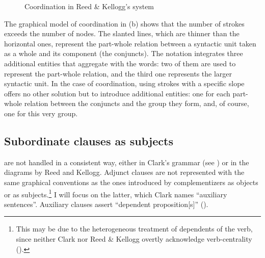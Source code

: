 \documentclass[english,output=paper,colorlinks,citecolor=brown]{../langscibook}
\begin{document}
\begin{figure}[b]
    \caption{Coordination in Reed \& Kellogg's system \label{fig:4:8}}
\end{figure}

The graphical model of coordination in (b) shows that the number of strokes exceeds the number of nodes. The slanted lines, which are thinner than the horizontal ones, represent the part-whole relation between a syntactic unit taken as a whole and its component (the conjuncts). The notation integrates three additional entities that aggregate with the words: two of them are used to represent the part-whole relation, and the third one represents the larger syntactic unit. In the case of coordination, using strokes with a specific slope offers no other solution but to introduce additional entities: one for each part-whole relation between the conjuncts and the group they form, and, of course, one for this very group.


\subsection{Subordinate clauses as subjects}\label{sec:4:4.3}

 are not handled in a consistent way, either in Clark’s grammar  (see \citealt[319--322 and 328--329]{Mazziotta2016}) or in the diagrams by Reed and Kellogg. Adjunct clauses are not represented with the same graphical conventions as the ones introduced by complementizers as objects or as subjects.\footnote{This may be due to the heterogeneous treatment of dependents of the verb, since neither Clark nor Reed \& Kellogg overtly acknowledge verb-centrality ().} I will focus on the latter, which Clark names “auxiliary sentences”. Auxiliary clauses assert “dependent proposition[s]” (\citeyear[187]{Clark1870}).
\end{document}
